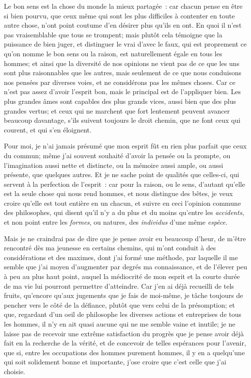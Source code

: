\documentclass[french,twoside]{book} %
\newcommand\chaptercont{} %
\begin{document}
\chaptercont
\noindent Le bon sens est la chose du monde la mieux partagée : car chacun pense en être si bien pourvu, que ceux même qui sont les plus difficiles à contenter en toute autre chose, n'ont point coutume d'en désirer plus qu'ils en ont. En quoi il n'est pas vraisemblable que tous se trompent; mais plutôt cela témoigne que la puissance de bien juger, et distinguer le vrai d'avec le faux, qui est proprement ce qu'on nomme le bon sens ou la raison, est naturellement égale en tous les hommes; et ainsi que la diversité de nos opinions ne vient pas de ce que les uns sont plus raisonnables que les autres, mais seulement de ce que nous conduisons nos pensées par diverses voies, et ne considérons pas les mêmes choses. Car ce n'est pas assez d'avoir l'esprit bon, mais le principal est de l'appliquer bien. Les plus grandes âmes sont capables des plus grands vices, aussi bien que des plus grandes vertus; et ceux qui ne marchent que fort lentement peuvent avancer beaucoup davantage, s'ils suivent toujours le droit chemin, que ne font ceux qui courent, et qui s'en éloignent.\par
Pour moi, je n'ai jamais présumé que mon esprit fût en rien plus parfait que ceux du commun; même j'ai souvent souhaité d'avoir la pensée ou la prompte, ou l'imagination aussi nette et distincte, ou la mémoire aussi ample, ou aussi présente, que quelques autres. Et je ne sache point de qualités que celles-ci, qui servent à la perfection de l'esprit : car pour la raison, ou le sens, d'autant qu'elle est la seule chose qui nous rend hommes, et nous distingue des bêtes, je veux croire qu'elle est tout entière en un chacun, et suivre en ceci l'opinion commune des philosophes, qui disent qu'il n'y a du plus et du moins qu'entre les {\itshape accidents}, et non point entre les {\itshape formes}, ou natures, des {\itshape individus} d'une même {\itshape espèce.}\par
Mais je ne craindrai pas de dire que je pense avoir eu beaucoup d'heur, de m'être rencontré dès ma jeunesse en certains chemins, qui m'ont conduit à des considérations et des maximes, dont j'ai formé une méthode, par laquelle il me semble que j'ai moyen d'augmenter par degrés ma connaissance, et de l'élever peu à peu au plus haut point, auquel la médiocrité de mon esprit et la courte durée de ma vie lui pourront permettre d'atteindre. Car j'en ai déjà recueilli de tels fruits, qu'encore qu'aux jugements que je fais de moi-même, je tâche toujours de pencher vers le côté de la défiance, plutôt que vers celui de la présomption; et que, regardant d'un oeil de philosophe les diverses actions et entreprises de tous les hommes, il n'y en ait quasi aucune qui ne me semble vaine et inutile; je ne laisse pas de recevoir une extrême satisfaction du progrès que je pense avoir déjà fait en la recherche de la vérité, et de concevoir de telles espérances pour l'avenir, que si, entre les occupations des hommes purement hommes, il y en a quelqu'une qui soit solidement bonne et importante, j'ose croire que c'est celle que j'ai choisie.\par
\end{document}
